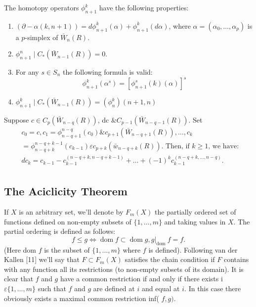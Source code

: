 \begin{lemm}
The homotopy operators $\phi_{n+1}^k$ have the following properties:
    \begin{enumerate}
        \item $(\partial - \alpha(k, n+1))=d \phi_{n+1}^k(\alpha)+\phi_{n+1}^k(d \alpha)$, where $\alpha=\left(\alpha_0, \ldots, \alpha_p\right)$ is a $p$-simplex of $\bar{W}_n(R)$.
        \item $\phi_{n+1}^n \mid C_*\left(\bar{W}_{n-1}(R)\right)=0$.
        \item For any $s \in S_n$ the following formula is valid:
        $$
        \phi_{n+1}^k\left(\alpha^s\right)=\left[\phi_{n+1}^s(k)(\alpha)\right]^s
        $$
        \item $\phi_{n+1}^k \mid C_*\left(\bar{W}_{n-1}(R)\right)=\left(\phi_n^k\right)(n+1, n)$   
    \end{enumerate}
\end{lemm}

\begin{lemm}
Suppose $c \in C_p\left(\bar{W}_{n-q}(R)\right)$, dc $\& C_{p-1}\left(\bar{W}_{n-q-1}(R)\right)$. Set
    $$
    \begin{aligned}
    & c_0=c, c_1=\phi_{n-q+1}^{n-q}\left(c_0\right) \& c_{p+1}\left(\bar{W}_{n-q+1}(R)\right), \ldots, c_k \\
    & =\phi_{n-q+k}^{n-q+k-1}\left(c_{k-1}\right) \varepsilon c_{p+k}\left(\bar{w}_{n-q+k}(R)\right) \text {. Then, if } k \geq 1 \text {, we have: } \\
    & d c_k=c_{k-1}-c_{k-1}^{(n-q+k, n-q+k-1)}+\ldots+(-1)^k c_{k-1}^{(n-q+k, \ldots, n-q)} . \\
    &
    \end{aligned}$$
\end{lemm}


\subsection{The Aciclicity Theorem}

If $X$ is an arbitrary set, we'll denote by $F_m(X)$ the partially ordered set of functions defined on non-empty subsets of $\{1, \ldots, m\}$ and taking values in $X$. The partial ordering is defined as follows:
$$
f \leq g \Leftrightarrow \operatorname{dom} f \subset \operatorname{dom} g,\left.g\right|_{\text {dom }} f=f .
$$
(Here dom $f$ is the subset of $\{1, \ldots, m\}$ where $f$ is defined). Following van der Kallen [11] we'll say that $F \subset F_m(X)$ satisfies the chain condition if $F$ contains with any function all its restrictions (to non-empty subsets of its domain). It is clear that $f$ and $g$ have a common restriction if and only if there exists i $\varepsilon\{1, \ldots, m\}$ such that $f$ and $g$ are defined at $i$ and equal at $i$. In this case there obviously exists a maximal common restriction inf( $f, g)$.

